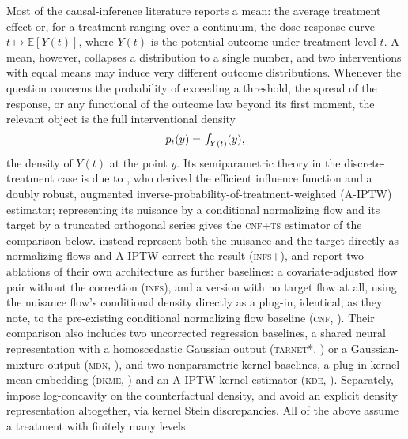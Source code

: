 \documentclass[11pt]{article}
\theoremstyle{plain}
\theoremstyle{definition}
\theoremstyle{remark}
\newcommand{\pE}{\ensuremath{\mathbb{E}}}
\newcommand{\pf}[1]{\ensuremath{\,\mathlarger{\textit{f}}_{#1}}}
\begin{document}
Most of the causal-inference literature reports a mean: the average treatment effect or, for
a treatment ranging over a continuum, the dose-response curve $t \mapsto \pE[Y(t)]$, where
$Y(t)$ is the potential outcome under treatment level $t$. A mean, however, collapses a
distribution to a single number, and two interventions with equal means may induce very
different outcome distributions. Whenever the question concerns the probability of exceeding
a threshold, the spread of the response, or any functional of the outcome law beyond its
first moment, the relevant object is the full interventional density
\[
p_t(y) = \pf{Y(t)}(y),
\]
the density of $Y(t)$ at the point $y$. Its semiparametric theory in the discrete-treatment
case is due to \citet{kennedy2023density}, who derived the efficient influence function and a
doubly robust, augmented inverse-probability-of-treatment-weighted (A-IPTW) estimator;
representing its
nuisance by a conditional normalizing flow and its target by a truncated orthogonal series
gives the \textsc{cnf+ts} estimator of the comparison below.
\citet{melnychuk2023flows} instead represent both the nuisance and the target directly as
normalizing flows and A-IPTW-correct the result (\textsc{infs+}), and report two ablations of
their own architecture as further baselines: a covariate-adjusted flow pair without the
correction (\textsc{infs}), and a version with no target flow at all, using the nuisance
flow's conditional density directly as a plug-in, identical, as they note, to the
pre-existing conditional normalizing flow baseline (\textsc{cnf}, \citealp{trippe2018cnf}).
Their comparison also includes two uncorrected regression baselines, a shared neural
representation with a homoscedastic Gaussian output (\textsc{tarnet*},
\citealp{shalit2017tarnet}) or a Gaussian-mixture output (\textsc{mdn},
\citealp{bishop1994mdn}), and two nonparametric kernel baselines, a plug-in kernel mean
embedding (\textsc{dkme}, \citealp{muandet2021counterfactual}) and an A-IPTW kernel estimator
(\textsc{kde}, \citealp{kim2018distributional}). Separately, \citet{ham2024logconcave} impose
log-concavity on the counterfactual density, and \citet{martinez2023stein} avoid an explicit
density representation altogether, via kernel Stein discrepancies. All of the above assume a
treatment with finitely many levels.
\end{document}
